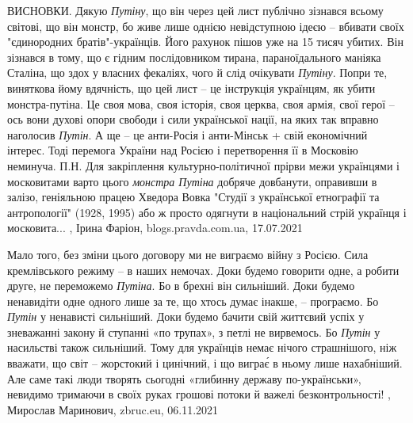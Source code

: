 ВИСНОВКИ.  Дякую \emph{Путіну}, що він через цей лист публічно зізнався всьому
світові, що він монстр, бо живе лише однією невідступною ідеєю – вбивати своїх
"єдинородних братів"-українців. Його рахунок пішов уже на 15 тисяч убитих. Він
зізнався в тому, що є гідним послідовником тирана, параноїдального маніяка
Сталіна, що здох у власних фекаліях, чого й слід очікувати \emph{Путіну}. Попри те,
виняткова йому вдячність, що цей лист – це інструкція українцям, як убити
монстра-путіна. Це своя мова, своя історія, своя церква, своя армія, свої герої
– ось вони духові опори свободи і сили української нації, на яких так вправно
наголосив \emph{Путін}. А ще – це анти-Росія і анти-Мінськ + свій економічний інтерес.
Тоді перемога України над Росією і перетворення її в Московію неминуча.  П.Н.
Для закріплення культурно-політичної прірви межи українцями і московитами варто
цього \emph{монстра Путіна} добряче довбанути, оправивши в залізо, геніяльною працею
Хведора Вовка "Студії з української етнографії та антропології" (1928, 1995)
або ж просто одягнути в національний стрій українця і московита...
, 
Ірина Фаріон, blogs.pravda.com.ua, 17.07.2021

Мало того, без зміни цього договору ми не виграємо війну з Росією. Сила
кремлівського режиму – в наших немочах. Доки будемо говорити одне, а робити
друге, не переможемо \emph{Путіна}. Бо в брехні він сильніший. Доки будемо
ненавидіти одне одного лише за те, що хтось думає інакше, – програємо. Бо
\emph{Путін} у ненависті сильніший. Доки будемо бачити свій життєвий успіх у
зневажанні закону й ступанні «по трупах», з петлі не вирвемось. Бо \emph{Путін}
у насильстві також сильніший.  Тому для українців немає нічого страшнішого, ніж
вважати, що світ – жорстокий і цинічний, і що виграє́ в ньому лише нахабніший.
Але саме такі люди творять сьогодні «глибинну державу по-українськи», невидимо
тримаючи в своїх руках грошові потоки й важелі безконтрольності!
, 
Мирослав Маринович, zbruc.eu, 06.11.2021
